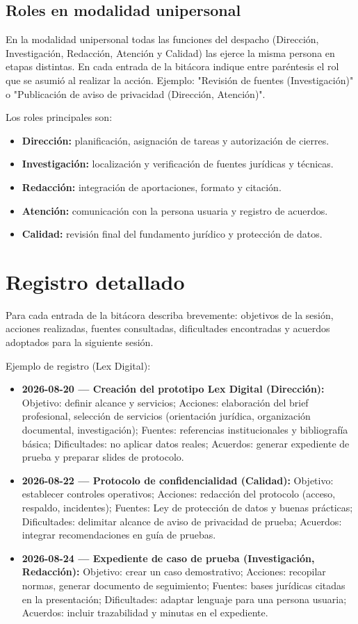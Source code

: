 \documentclass[
  spanish,
  letterpaper, oneside
]{article}
\begin{document}
\subsection{Roles en modalidad unipersonal}

En la modalidad unipersonal todas las funciones del despacho (Dirección, Investigación, Redacción, Atención y Calidad) las ejerce la misma persona en etapas distintas. En cada entrada de la bitácora indique entre paréntesis el rol que se asumió al realizar la acción. Ejemplo: "Revisión de fuentes (Investigación)" o "Publicación de aviso de privacidad (Dirección, Atención)".

Los roles principales son:
\begin{itemize}
  \item \textbf{Dirección:} planificación, asignación de tareas y autorización de cierres.
  \item \textbf{Investigación:} localización y verificación de fuentes jurídicas y técnicas.
  \item \textbf{Redacción:} integración de aportaciones, formato y citación.
  \item \textbf{Atención:} comunicación con la persona usuaria y registro de acuerdos.
  \item \textbf{Calidad:} revisión final del fundamento jurídico y protección de datos.
\end{itemize}

\section{Registro detallado}
Para cada entrada de la bitácora describa brevemente: objetivos de la sesión, acciones realizadas, fuentes consultadas, dificultades encontradas y acuerdos adoptados para la siguiente sesión.

Ejemplo de registro (Lex Digital):
\begin{itemize}
  \item \textbf{2026-08-20 — Creación del prototipo Lex Digital (Dirección):} Objetivo: definir alcance y servicios; Acciones: elaboración del brief profesional, selección de servicios (orientación jurídica, organización documental, investigación); Fuentes: referencias institucionales y bibliografía básica; Dificultades: no aplicar datos reales; Acuerdos: generar expediente de prueba y preparar slides de protocolo.
  \item \textbf{2026-08-22 — Protocolo de confidencialidad (Calidad):} Objetivo: establecer controles operativos; Acciones: redacción del protocolo (acceso, respaldo, incidentes); Fuentes: Ley de protección de datos y buenas prácticas; Dificultades: delimitar alcance de aviso de privacidad de prueba; Acuerdos: integrar recomendaciones en guía de pruebas.
  \item \textbf{2026-08-24 — Expediente de caso de prueba (Investigación, Redacción):} Objetivo: crear un caso demostrativo; Acciones: recopilar normas, generar documento de seguimiento; Fuentes: bases jurídicas citadas en la presentación; Dificultades: adaptar lenguaje para una persona usuaria; Acuerdos: incluir trazabilidad y minutas en el expediente.
\end{itemize}
\end{document}
